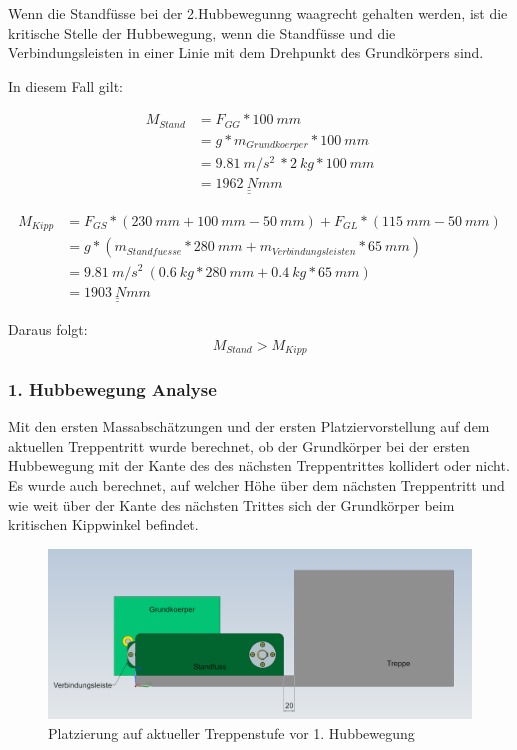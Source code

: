 Wenn die Standfüsse bei der 2.Hubbewegunng waagrecht gehalten werden, ist die kritische Stelle der Hubbewegung, wenn die Standfüsse und die Verbindungsleisten in einer Linie mit dem Drehpunkt des Grundkörpers sind.

In diesem Fall gilt:

\begin{align*}
    M_{Stand} &= F_{GG} * 100\ mm \\
    &= g * m_{Grundkoerper} * 100\ mm \\
    &= 9.81\ m/s^2\ * 2\ kg * 100\ mm \\
    &= \underline{\underline{1962\ Nmm}}
\end{align*}

\begin{align*}
    M_{Kipp}  &= F_{GS} * (230\ mm + 100\ mm - 50\ mm) + F_{GL} * (115\ mm - 50\ mm) \\
    &= g * (m_{Standfuesse} * 280\ mm + m_{Verbindungsleisten} * 65\ mm) \\
    &= 9.81\ m/s^2\ (0.6\ kg * 280\ mm + 0.4\ kg * 65\ mm) \\
    &= \underline{\underline{1903\ Nmm}}
\end{align*}
  
Daraus folgt:
\[M_{Stand} > M_{Kipp}\]

\subsubsection{1. Hubbewegung Analyse}
\label{HubbewegungAnalyse}

Mit den ersten Massabschätzungen und der ersten Platziervorstellung auf dem aktuellen Treppentritt wurde berechnet, ob der Grundkörper bei der ersten Hubbewegung mit der Kante des des nächsten Treppentrittes kollidert oder nicht. Es wurde auch berechnet, auf welcher Höhe über dem nächsten Treppentritt und wie weit über der Kante des nächsten Trittes sich der Grundkörper beim kritischen Kippwinkel befindet.

\begin{figure}[H]
  \includegraphics[width=1\textwidth]{img/Treppensteigen/Platzierung auf Treppe.PNG}
  \centering
  \caption{Platzierung auf aktueller Treppenstufe vor 1. Hubbewegung}
\end{figure}

